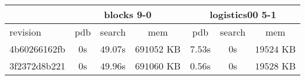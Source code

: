 \documentclass[a4paper,12pt]{scrartcl}
\begin{document}

\begin{tabular}{|l|c|c|c|c|c|c|}\hline
& \multicolumn{3}{c|}{blocks 9-0} & \multicolumn{3}{c|}{logistics00 5-1}\\\hline
revision & pdb & search & mem & pdb & search & mem\\\hline
4b60266162fb & $0$s & $49.07$s & $691052$ KB & $7.53$s & $0$s & $19524$ KB\\\hline
3f2372d8b221 & $0$s & $49.96$s & $691060$ KB & $0.56$s & $0$s & $19528$ KB\\\hline
\end{tabular}
\end{document}
